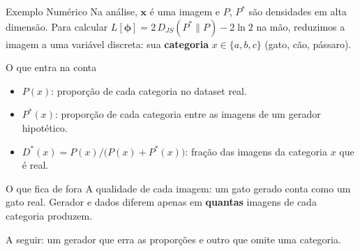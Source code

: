 \documentclass[aspectratio=169,xcolor=dvipsnames]{beamer}
\begin{document}
  \begin{frame}{Exemplo Numérico}
    Na análise, $\mathbf{x}$ é uma imagem e $P$, $P^{*}$ são densidades em
    alta dimensão. Para calcular $L[\bm{\phi}] = 2\,D_{JS}(P^{*}\|P) - 2\ln 2$
    na mão, reduzimos a imagem a uma variável discreta: sua
    \textbf{categoria} $x \in \{a, b, c\}$ (gato, cão, pássaro).
    \begin{block}{O que entra na conta}
      \begin{itemize}
        \item $P(x)$: proporção de cada categoria no dataset real.
        \item $P^{*}(x)$: proporção de cada categoria entre as imagens de um
              gerador hipotético.
        \item $D^{*}(x) = P(x)/\bigl(P(x) + P^{*}(x)\bigr)$: fração das
              imagens da categoria $x$ que é real.
      \end{itemize}
    \end{block}
    \begin{block}{O que fica de fora}
      A qualidade de cada imagem: um gato gerado conta como um gato real.
      Gerador e dados diferem apenas em \textbf{quantas} imagens de cada
      categoria produzem.
    \end{block}
    A seguir: um gerador que erra as proporções e outro que omite uma categoria.
  \end{frame}
\end{document}
